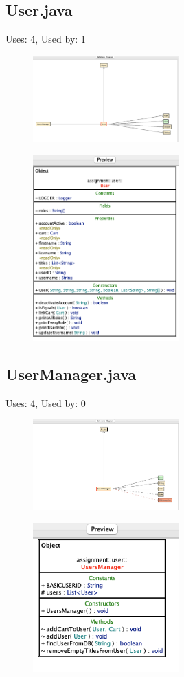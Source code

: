 \documentclass{article}
\begin{document}
\subsection{User.java}
Uses: 4, Used by: 1
\begin{figure}[H]
    \centering
    \includegraphics[width=0.5\textwidth]{img/userDiagram.png}
\end{figure}
\begin{figure}[H]
    \centering
    \includegraphics[width=0.5\textwidth]{img/userPreview.png}
\end{figure}
\subsection{UserManager.java}
Uses: 4, Used by: 0
\begin{figure}[H]
    \centering
    \includegraphics[width=0.5\textwidth]{img/userManagerDiagram.png}
\end{figure}
\begin{figure}[H]
    \centering
    \includegraphics[width=0.5\textwidth]{img/userManagerPreview.png}
\end{figure}
\end{document}
